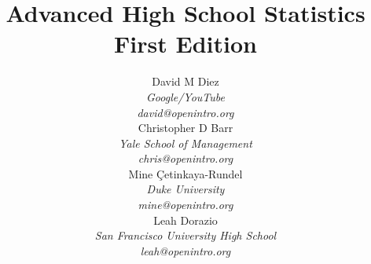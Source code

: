 
\title{\huge Advanced High School Statistics\vspace{1.5mm} \\ \Large First Edition}
\author{David M Diez \\
\small\emph{Google/YouTube} \\
\vspace{6mm}%
\small\emph{david@openintro.org} \\
Christopher D Barr \\
\small\emph{Yale School of Management} \\
\vspace{6mm}%
\small\emph{chris@openintro.org} \\
Mine \c{C}etinkaya-Rundel \\
\small\emph{Duke University} \\
\vspace{6mm}%
\small\emph{mine@openintro.org} \\
Leah Dorazio \\
\small\emph{San Francisco University High School} \\
\small\emph{leah@openintro.org}}
